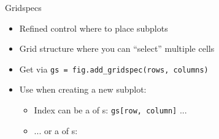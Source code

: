 
\begin{frame}[fragile]{Gridspecs}
%
\begin{itemize}
\item Refined control where to place subplots
\item Grid structure where you can \enquote{select} multiple cells
\item Get via \texttt{gs = fig.add\_gridspec(rows, columns)}
\item Use when creating a new subplot: 
	\begin{itemize}
	\item Index can be a  of s: \texttt{gs[row, column]} ...
	\item ... or a  of s: 
	\end{itemize}
\end{itemize}
%
\end{frame}


